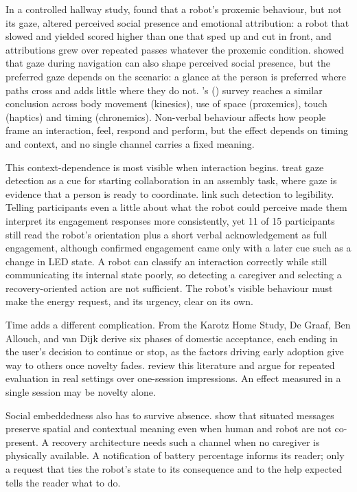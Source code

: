 In a controlled hallway study, \citet{Fiore2013SocialCues} found that a robot's proxemic behaviour, but not its gaze, altered perceived social presence and emotional attribution: a robot that slowed and yielded scored higher than one that sped up and cut in front, and attributions grew over repeated passes whatever the proxemic condition. \citet{He2024RobotGaze} showed that gaze during navigation can also shape perceived social presence, but the preferred gaze depends on the scenario: a glance at the person is preferred where paths cross and adds little where they do not. \citeauthor{Saunderson2019Nonverbal}'s (\citeyear{Saunderson2019Nonverbal}) survey reaches a similar conclusion across body movement (kinesics), use of space (proxemics), touch (haptics) and timing (chronemics). Non-verbal behaviour affects how people frame an interaction, feel, respond and perform, but the effect depends on timing and context, and no single channel carries a fixed meaning.

This context-dependence is most visible when interaction begins. \citet{LavitNicora2024GazeDetection} treat gaze detection as a cue for starting collaboration in an assembly task, where gaze is evidence that a person is ready to coordinate. \citet{AbadMoya2026Initiation} link such detection to legibility. Telling participants even a little about what the robot could perceive made them interpret its engagement responses more consistently, yet 11 of 15 participants still read the robot's orientation plus a short verbal acknowledgement as full engagement, although confirmed engagement came only with a later cue such as a change in LED state. A robot can classify an interaction correctly while still communicating its internal state poorly, so detecting a caregiver and selecting a recovery-oriented action are not sufficient. The robot's visible behaviour must make the energy request, and its urgency, clear on its own.

Time adds a different complication. From the Karotz Home Study, De Graaf, Ben Allouch, and van Dijk \citeyearpar{DeGraaf2016LongTermAcceptance} derive six phases of domestic acceptance, each ending in the user's decision to continue or stop, as the factors driving early adoption give way to others once novelty fades. \citet{Matheus2025LongTerm} review this literature and argue for repeated evaluation in real settings over one-session impressions. An effect measured in a single session may be novelty alone.

Social embeddedness also has to survive absence. \citet{Marquardt2009SituatedMessages} show that situated messages preserve spatial and contextual meaning even when human and robot are not co-present. A recovery architecture needs such a channel when no caregiver is physically available. A notification of battery percentage informs its reader; only a request that ties the robot's state to its consequence and to the help expected tells the reader what to do.

